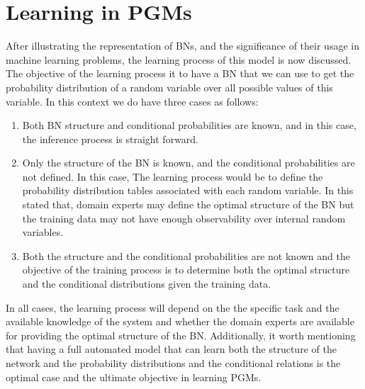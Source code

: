\documentclass{article}
\begin{document}
\section{Learning in PGMs}
After illustrating the representation of BNs, and the significance of their usage in machine learning problems, the learning process of this model is now discussed. The objective of the learning process it to have a BN that we can use to get the probability distribution of a random variable over all possible values of this variable. In this context we do have three cases as follows:
\begin{enumerate}
\item Both BN structure and conditional probabilities are known, and in this case, the inference process is straight forward. 
\item Only the structure of the BN is known, and the conditional probabilities are not defined. In this case, The learning process would be to define the probability distribution tables associated with each random variable. In this stated that, domain experts may define the optimal structure of the BN but the training data may not have enough observability over internal random variables.
\item Both the structure and the conditional probabilities are not known and the objective of the training process is to determine both the optimal structure and the conditional distributions given the training data. 
\end{enumerate}
In all cases, the learning process will depend on the the specific task and the available knowledge of the system and whether the domain experts are available for providing the optimal structure of the BN. Additionally, it worth mentioning that having a full automated model that can learn both the structure of the network and the probability distributions and the conditional relations is the optimal case and the ultimate objective in learning PGMs.
\end{document}
